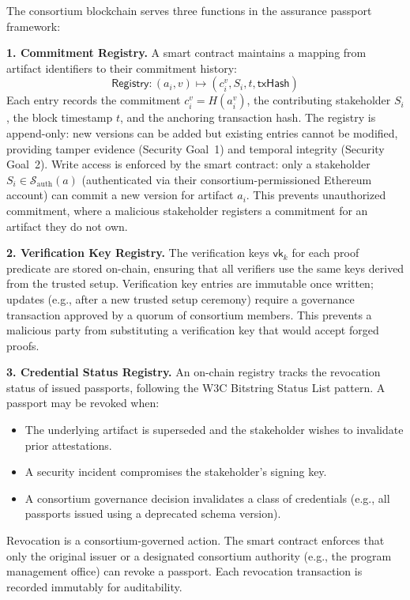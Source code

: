 The consortium blockchain serves three functions in the assurance passport framework:

\textbf{1. Commitment Registry.}
A smart contract maintains a mapping from artifact identifiers to their commitment history:
\begin{equation}
\label{eq:registry}
\mathsf{Registry}: (a_i, v) \mapsto (c_i^{v}, S_i, t, \mathsf{txHash})
\end{equation}
Each entry records the commitment $c_i^{v} = H(a_i^{v})$, the contributing stakeholder $S_i$, the block timestamp $t$, and the anchoring transaction hash.
The registry is append-only: new versions can be added but existing entries cannot be modified, providing tamper evidence (Security Goal~1) and temporal integrity (Security Goal~2).
Write access is enforced by the smart contract: only a stakeholder $S_i \in \mathcal{S}_{\text{auth}}(a)$ (authenticated via their consortium-permissioned Ethereum account) can commit a new version for artifact $a_i$.
This prevents unauthorized commitment, where a malicious stakeholder registers a commitment for an artifact they do not own.

\textbf{2. Verification Key Registry.}
The verification keys $\mathsf{vk}_k$ for each proof predicate are stored on-chain, ensuring that all verifiers use the same keys derived from the trusted setup.
Verification key entries are immutable once written; updates (e.g., after a new trusted setup ceremony) require a governance transaction approved by a quorum of consortium members.
This prevents a malicious party from substituting a verification key that would accept forged proofs.

\textbf{3. Credential Status Registry.}\label{sec:fw-revocation}
An on-chain registry tracks the revocation status of issued passports, following the W3C Bitstring Status List pattern.
A passport may be revoked when:
\begin{itemize}
    \item The underlying artifact is superseded and the stakeholder wishes to invalidate prior attestations.
    \item A security incident compromises the stakeholder's signing key.
    \item A consortium governance decision invalidates a class of credentials (e.g., all passports issued using a deprecated schema version).
\end{itemize}
Revocation is a consortium-governed action.
The smart contract enforces that only the original issuer or a designated consortium authority (e.g., the program management office) can revoke a passport.
Each revocation transaction is recorded immutably for auditability.

